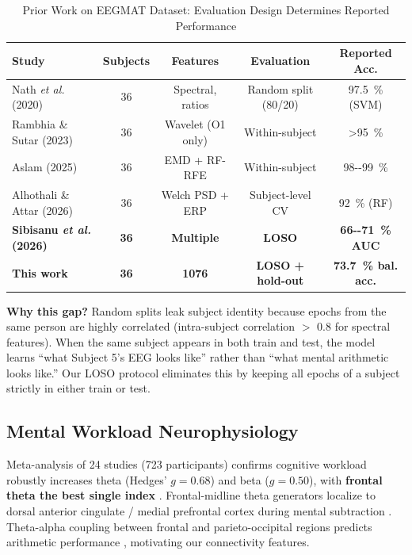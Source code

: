 \documentclass[conference]{IEEEtran}
\begin{document}
\begin{table}[htbp]
\caption{Prior Work on EEGMAT Dataset: Evaluation Design Determines Reported Performance}
\label{tab:prior}
\centering
\begin{tabular}{@{}lcccc@{}}
\toprule
Study & Subjects & Features & Evaluation & Reported Acc. \\
\midrule
Nath \textit{et al.} \cite{nath2020eeg} (2020) & 36 & Spectral, ratios & Random split (80/20) & \SI{97.5}{\%} (SVM) \\
Rambhia \& Sutar \cite{rambhia2023classification} (2023) & 36 & Wavelet (O1 only) & Within-subject & \SI{>95}{\%} \\
Aslam \cite{aslam2025electroencephalograph} (2025) & 36 & EMD + RF-RFE & Within-subject & \SI{98--99}{\%} \\
Alhothali \& Attar \cite{alhothali2026validation} (2026) & 36 & Welch PSD + ERP & Subject-level CV & \SI{92}{\%} (RF) \\
\textbf{Sibisanu \textit{et al.} \cite{sibisanu2026high} (2026)} & \textbf{36} & \textbf{Multiple} & \textbf{LOSO} & \textbf{\SI{66--71}{\%} AUC} \\
\textbf{This work} & \textbf{36} & \textbf{\num{1076}} & \textbf{LOSO + hold-out} & \textbf{\SI{73.7}{\%} bal. acc.} \\
\bottomrule
\end{tabular}
\end{table}

\textbf{Why this gap?} Random splits leak subject identity because epochs from the same person are highly correlated (intra-subject correlation $>$ 0.8 for spectral features). When the same subject appears in both train and test, the model learns ``what Subject 5's EEG looks like'' rather than ``what mental arithmetic looks like.'' Our LOSO protocol eliminates this by keeping all epochs of a subject strictly in either train or test.

\subsection{Mental Workload Neurophysiology}
Meta-analysis of \num{24} studies (\num{723} participants) confirms cognitive workload robustly increases theta (Hedges' $g = 0.68$) and beta ($g = 0.50$), with \textbf{frontal theta the best single index} \cite{chikhi2022eeg}. Frontal-midline theta generators localize to dorsal anterior cingulate / medial prefrontal cortex during mental subtraction \cite{ishii2014frontal}. Theta-alpha coupling between frontal and parieto-occipital regions predicts arithmetic performance \cite{dimitriadis2016causal}, motivating our connectivity features.
\end{document}
